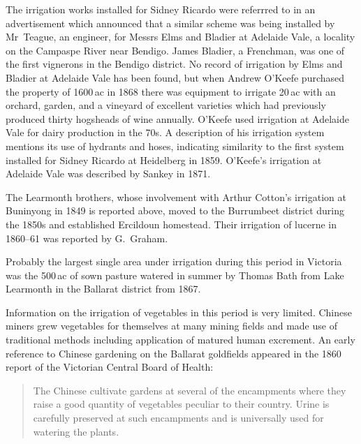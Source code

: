 The irrigation works installed for Sidney Ricardo were referrred to in
an advertisement which announced that a similar scheme was being
installed by Mr~Teague, an engineer, for Messrs Elms and Bladier at
Adelaide Vale, a locality on the Campaspe River near Bendigo.  James
Bladier, a Frenchman, was one of the first vignerons in the Bendigo
district.  No record of irrigation by Elms and Bladier at Adelaide
Vale has been found, but when Andrew O'Keefe purchased the property of
1600\,ac in 1868 there was equipment to irrigate 20\,ac with an
orchard, garden, and a vineyard of excellent varieties which had
previously produced thirty hogsheads of wine annually.  O'Keefe used
irrigation at Adelaide Vale for dairy production in the 70s.  A
description of his irrigation system mentions its use of hydrants and
hoses, indicating similarity to the first system installed for Sidney
Ricardo at Heidelberg in 1859.  O'Keefe's irrigation at Adelaide Vale
was described by Sankey in 1871.

The Learmonth brothers, whose involvement with Arthur Cotton's
irrigation at Buninyong in 1849 is reported above, moved to the
Burrumbeet district during the 1850s and established Ercildoun
homestead. Their irrigation of lucerne in 1860--61 was reported by
G.~Graham.

Probably the largest single area under irrigation during this period
in Victoria was the 500\,ac of sown pasture watered in summer by
Thomas Bath from Lake Learmonth in the Ballarat district from
1867.

Information on the irrigation of vegetables in this period is very
limited.  Chinese miners grew vegetables for themselves at many mining
fields and made use of traditional methods including application of
matured human excrement.  An early reference to Chinese gardening on
the Ballarat goldfields appeared in the 1860 report of the Victorian
Central Board of Health:
\begin{quote}
	The Chinese cultivate gardens at several of the encampments
	where they raise a good quantity of vegetables peculiar to
	their country.  Urine is carefully preserved at such
	encampments and is universally used for watering the
	plants.
\end{quote}

